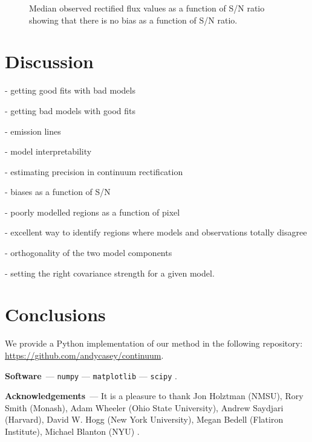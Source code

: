\documentclass[modern]{aastex631}
\renewcommand{\paragraph}[1]{\medskip\par\noindent\textbf{#1}~---}
\begin{document}
\begin{figure}
    \caption{Median observed rectified flux values as a function of S/N ratio showing that there is no bias as a function of S/N ratio.}
\end{figure}




\section{Discussion}\label{sec:discussion}

- getting good fits with bad models

- getting bad models with good fits

- emission lines

- model interpretability

- estimating precision in continuum rectification

- biases as a function of S/N

- poorly modelled regions as a function of pixel

- excellent way to identify regions where models and observations totally disagree

- orthogonality of the two model components

- setting the right covariance strength for a given model.


\section{Conclusions}
\label{sec:conclusions}



\noindent{}We provide a Python implementation of our method in the following repository: \url{https://github.com/andycasey/continuum}.

\paragraph{Software}
\texttt{numpy} \citep{numpy} ---
\texttt{matplotlib} \citep{matplotlib} ---
\texttt{scipy} \citep{scipy}.

\paragraph{Acknowledgements}
It is a pleasure to thank
    Jon Holztman (NMSU),
    Rory Smith (Monash),
    Adam Wheeler (Ohio State University),
    Andrew Saydjari (Harvard),
    David W. Hogg (New York University),
    Megan Bedell (Flatiron Institute),
    Michael Blanton (NYU)
.

%
\end{document}
